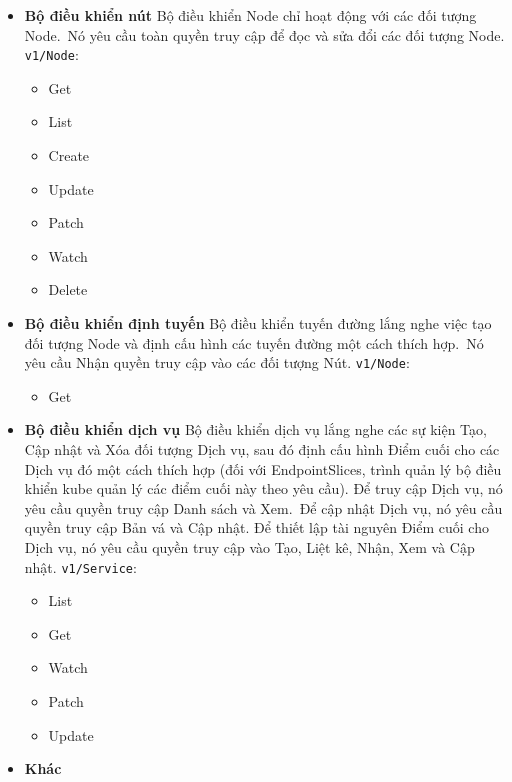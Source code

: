 \documentclass[12pt,a4paper]{report}
\begin{document}
	\hspace{1cm}{Phần này chia nhỏ quyền truy cập mà trình quản lý bộ điều khiển đám mây yêu cầu trên các đối tượng API khác nhau để thực hiện các hoạt động của nó.}
	\begin{itemize}
		\item \textbf{Bộ điều khiển nút}
		\smallskip
		\subitem Bộ điều khiển Node chỉ hoạt động với các đối tượng Node. Nó yêu cầu toàn quyền truy cập để đọc và sửa đổi các đối tượng Node.
		\subitem \texttt{v1/Node}:
		\begin{itemize}
			\item Get
			\item List
			\item Create
			\item Update
			\item Patch
			\item Watch
			\item Delete
		\end{itemize}
		\item \textbf{Bộ điều khiển định tuyến}
		\smallskip
		\subitem Bộ điều khiển tuyến đường lắng nghe việc tạo đối tượng Node và định cấu hình các tuyến đường một cách thích hợp. Nó yêu cầu Nhận quyền truy cập vào các đối tượng Nút.
		\subitem \texttt{v1/Node}:
		\begin{itemize}
			\item Get
		\end{itemize}
		\item \textbf{Bộ điều khiển dịch vụ}
		\smallskip
		\subitem Bộ điều khiển dịch vụ lắng nghe các sự kiện Tạo, Cập nhật và Xóa đối tượng Dịch vụ, sau đó định cấu hình Điểm cuối cho các Dịch vụ đó một cách thích hợp (đối với EndpointSlices, trình quản lý bộ điều khiển kube quản lý các điểm cuối này theo yêu cầu).
		\smallskip
		\subitem Để truy cập Dịch vụ, nó yêu cầu quyền truy cập Danh sách và Xem. Để cập nhật Dịch vụ, nó yêu cầu quyền truy cập Bản vá và Cập nhật.
		\smallskip
		\subitem Để thiết lập tài nguyên Điểm cuối cho Dịch vụ, nó yêu cầu quyền truy cập vào Tạo, Liệt kê, Nhận, Xem và Cập nhật.
		\subitem \texttt{v1/Service}:
		\begin{itemize}
			\item List
			\item Get
			\item Watch
			\item Patch
			\item Update
		\end{itemize}
		\item \textbf{Khác}

\end{itemize}
\end{document}
